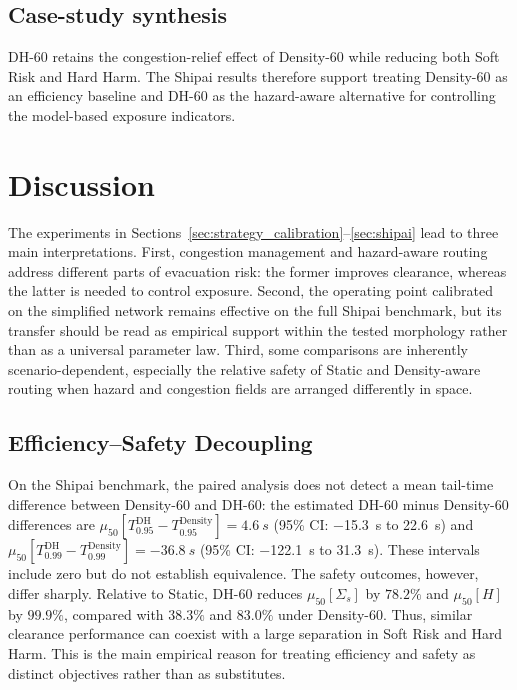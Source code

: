 \documentclass[preprint,12pt]{elsarticle}
\providecommand{\FloatBarrier}{}
\let\origsection\section
\renewcommand{\section}{\FloatBarrier\origsection}
\let\origsubsection\subsection
\renewcommand{\subsection}{\FloatBarrier\origsubsection}
\begin{document}
\subsection{Case-study synthesis}
\label{sec:shipai_synthesis}

DH-60 retains the congestion-relief effect of Density-60 while reducing
both Soft Risk and Hard Harm. The Shipai results therefore support treating
Density-60 as an efficiency baseline and DH-60 as the hazard-aware
alternative for controlling the model-based exposure indicators.


\FloatBarrier
\section{Discussion}
\label{sec:discussion}

The experiments in
Sections~\ref{sec:strategy_calibration}--\ref{sec:shipai} lead to three
main interpretations. First, congestion management and hazard-aware
routing address different parts of evacuation risk: the former improves
clearance, whereas the latter is needed to control exposure. Second, the
operating point calibrated on the simplified network remains effective
on the full Shipai benchmark, but its transfer should be read as
empirical support within the tested morphology rather than as a
universal parameter law. Third, some comparisons are inherently
scenario-dependent, especially the relative safety of Static and
Density-aware routing when hazard and congestion fields are arranged
differently in space.

\subsection{Efficiency--Safety Decoupling}
\label{sec:disc_coupling}

On the Shipai benchmark, the paired analysis does not detect a mean
tail-time difference between Density-60 and DH-60: the estimated
DH-60 minus Density-60 differences are
$\mu_{50}[T_{0.95}^{\mathrm{DH}}-T_{0.95}^{\mathrm{Density}}]
=\SI{4.6}{s}$
(95\% CI: \SI{-15.3}{s} to \SI{22.6}{s}) and
$\mu_{50}[T_{0.99}^{\mathrm{DH}}-T_{0.99}^{\mathrm{Density}}]
=\SI{-36.8}{s}$ (95\% CI: \SI{-122.1}{s} to \SI{31.3}{s}). These intervals
include zero but do not establish equivalence. The safety outcomes,
however, differ sharply. Relative to
Static, DH-60 reduces $\mu_{50}[\Sigma_s]$ by $78.2\%$ and
$\mu_{50}[H]$ by
$99.9\%$, compared with $38.3\%$ and $83.0\%$ under Density-60. Thus,
similar clearance performance can coexist with a large separation in
Soft Risk and Hard Harm. This is the main empirical reason for treating
efficiency and safety as distinct objectives rather than as substitutes.
\end{document}
